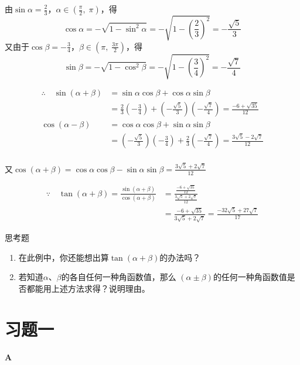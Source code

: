 \begin{solution}
由$\sin\alpha=\frac{2}{3}$，$\alpha\in\left(\frac{\pi}{2},\; \pi\right)$，得
\[\cos\alpha=-\sqrt{1-\sin^2\alpha}=-\sqrt{1-\left(\frac{2}{3}\right)^2}=-\frac{\sqrt{5}}{3}\]
又由于$\cos\beta=-\frac{3}{4}$，$\beta\in\left(\pi,\; \frac{3\pi}{2}\right)$，得
\[\sin\beta=-\sqrt{1-\cos^2\beta}=-\sqrt{1-\left(\frac{3}{4}\right)^2}=-\frac{\sqrt{7}}{4}\]

\[\begin{split}
    \therefore\quad \sin(\alpha+\beta)&=\sin\alpha\cos\beta+\cos\alpha\sin\beta\\
&=\frac{2}{3}\left(-\frac{3}{4}\right)+\left(-\frac{\sqrt{5}}{3}\right)\left(-\frac{\sqrt{7}}{4}\right)=\frac{-6+\sqrt{35}}{12}\\
\cos(\alpha-\beta)&=\cos\alpha\cos\beta+\sin\alpha\sin\beta\\
&=\left(-\frac{\sqrt{5}}{3}\right)\left(-\frac{3}{4}\right)+\frac{2}{3}\left(-\frac{\sqrt{7}}{4}\right)=\frac{3\sqrt{5}-2\sqrt{7}}{12}\\
\end{split}\]

又$\cos(\alpha+\beta)=\cos\alpha\cos\beta-\sin\alpha\sin\beta=\frac{3\sqrt{5}+2\sqrt{7}}{12}$

\[\begin{split}
\because\quad \tan(\alpha+\beta)=\frac{\sin(\alpha+\beta)}{\cos(\alpha+\beta)}&=\frac{\frac{-6+\sqrt{35}}{12}}{\frac{3\sqrt{5}+2\sqrt{7}}{12}}\\
&=\frac{-6+\sqrt{35}}{3\sqrt{5}+2\sqrt{7}}=\frac{-32\sqrt{5}+27\sqrt{7}}{17}
\end{split}\]
\end{solution}

\begin{thm}
    {思考题}
\begin{enumerate}[(1)]
\item 在此例中，你还能想出算$\tan(\alpha+\beta)$的办法吗？
\item 若知道$\alpha$、$\beta$的各自任何一种角函数值，那么
$(\alpha\pm\beta)$的任何一种角函数值是否都能用上述方法求得？说明理由。
\end{enumerate}
\end{thm}

\section*{习题一}
\begin{center}
    \bfseries A
\end{center}

